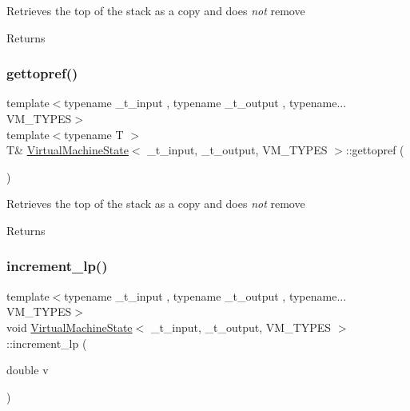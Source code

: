 Retrieves the top of the stack as a copy and does {\itshape not} remove \begin{DoxyReturn}{Returns}

\end{DoxyReturn}
\mbox{\label{class_virtual_machine_state_a158edda7fbaf5e64b60f7723877cd608}} 
\subsubsection{\texorpdfstring{gettopref()}{gettopref()}}
{\footnotesize\ttfamily template$<$typename \+\_\+t\+\_\+input , typename \+\_\+t\+\_\+output , typename... V\+M\+\_\+\+T\+Y\+P\+ES$>$ \\
template$<$typename T $>$ \\
T\& \hyperlink{class_virtual_machine_state}{Virtual\+Machine\+State}$<$ \+\_\+t\+\_\+input, \+\_\+t\+\_\+output, V\+M\+\_\+\+T\+Y\+P\+ES $>$\+::gettopref (\begin{DoxyParamCaption}{ }\end{DoxyParamCaption})\hspace{0.3cm}{\ttfamily [inline]}}

Retrieves the top of the stack as a copy and does {\itshape not} remove \begin{DoxyReturn}{Returns}

\end{DoxyReturn}
\mbox{\label{class_virtual_machine_state_a160c5e22c2acd3997d0bb188ce296b2f}} 
\subsubsection{\texorpdfstring{increment\+\_\+lp()}{increment\_lp()}}
{\footnotesize\ttfamily template$<$typename \+\_\+t\+\_\+input , typename \+\_\+t\+\_\+output , typename... V\+M\+\_\+\+T\+Y\+P\+ES$>$ \\
void \hyperlink{class_virtual_machine_state}{Virtual\+Machine\+State}$<$ \+\_\+t\+\_\+input, \+\_\+t\+\_\+output, V\+M\+\_\+\+T\+Y\+P\+ES $>$\+::increment\+\_\+lp (\begin{DoxyParamCaption}\item[{double}]{v }\end{DoxyParamCaption})\hspace{0.3cm}{\ttfamily [inline]}}

